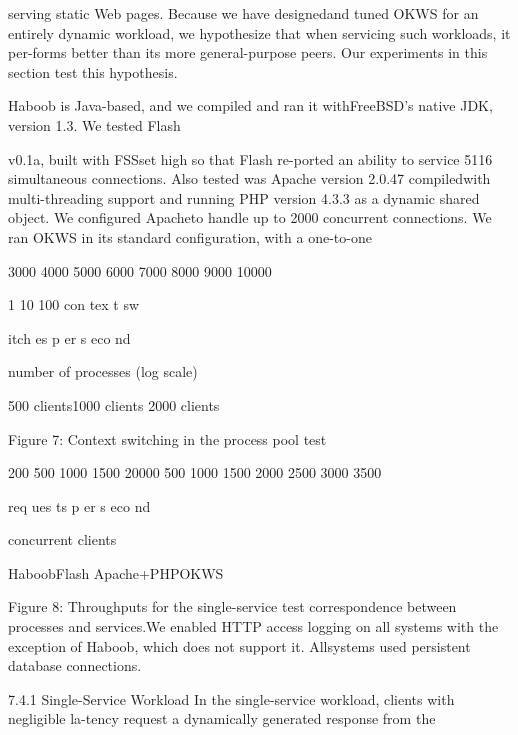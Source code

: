 serving static Web pages. Because we have designedand tuned OKWS for an entirely dynamic workload, we
hypothesize that when servicing such workloads, it per-forms better than its more general-purpose peers. Our
experiments in this section test this hypothesis.

Haboob is Java-based, and we compiled and ran it withFreeBSD's native JDK, version 1.3. We tested Flash

v0.1a, built with F\Gamma  S\Delta \Theta S\Lambda \Xi \Delta  set high so that Flash re-ported an ability to service 5116 simultaneous connections. Also tested was Apache version 2.0.47 compiledwith multi-threading support and running PHP version
4.3.3 as a dynamic shared object. We configured Apacheto handle up to 2000 concurrent connections. We ran
OKWS in its standard configuration, with a one-to-one

 3000
 4000
 5000
 6000
 7000
 8000
 9000
 10000

 1  10  100
con
tex
t sw

itch
es p
er s
eco
nd

number of processes (log scale)

500 clients1000 clients
2000 clients

Figure 7: Context switching in the process pool test

200 500 1000 1500 20000
500
1000
1500
2000
2500
3000
3500

req
ues
ts p
er s
eco
nd

concurrent clients

HaboobFlash
Apache+PHPOKWS

Figure 8: Throughputs for the single-service test
correspondence between processes and services.We enabled HTTP access logging on all systems with
the exception of Haboob, which does not support it. Allsystems used persistent database connections.

7.4.1 Single-Service Workload
In the single-service workload, clients with negligible la-tency request a dynamically generated response from the

